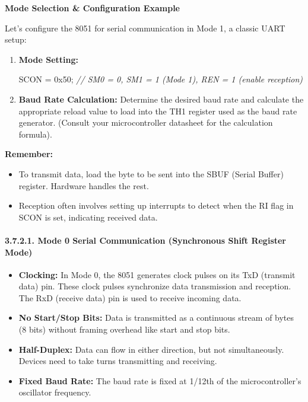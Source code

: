 \documentclass[
]{article}
\newenvironment{Shaded}{}{}
\newcommand{\BaseNTok}[1]{\textcolor[rgb]{0.25,0.63,0.44}{#1}}
\newcommand{\CommentTok}[1]{\textcolor[rgb]{0.38,0.63,0.69}{\textit{#1}}}
\newcommand{\NormalTok}[1]{#1}
\newcommand{\OperatorTok}[1]{\textcolor[rgb]{0.40,0.40,0.40}{#1}}
\begin{document}
\textbf{Mode Selection \& Configuration Example}

Let's configure the 8051 for serial communication in Mode 1, a classic
UART setup:

\begin{enumerate}
\def\labelenumi{\arabic{enumi}.}
\item
  \textbf{Mode Setting:}

\begin{Shaded}
\begin{Highlighting}[]
\NormalTok{SCON }\OperatorTok{=} \BaseNTok{0x50}\OperatorTok{;} \CommentTok{// SM0 = 0, SM1 = 1 (Mode 1), REN = 1 (enable reception)}
\end{Highlighting}
\end{Shaded}
\item
  \textbf{Baud Rate Calculation:} Determine the desired baud rate and
  calculate the appropriate reload value to load into the TH1 register
  used as the baud rate generator. (Consult your microcontroller
  datasheet for the calculation formula).
\end{enumerate}

\textbf{Remember:}

\begin{itemize}
\item
  To transmit data, load the byte to be sent into the SBUF (Serial
  Buffer) register. Hardware handles the rest.
\item
  Reception often involves setting up interrupts to detect when the RI
  flag in SCON is set, indicating received data.
\end{itemize}

\hypertarget{3721-mode-0-serial-communication-synchronous-shift-register-mode}{%
\paragraph{3.7.2.1. Mode 0 Serial Communication (Synchronous Shift
Register
Mode)}\label{3721-mode-0-serial-communication-synchronous-shift-register-mode}}

\begin{itemize}
\item
  \textbf{Clocking:} In Mode 0, the 8051 generates clock pulses on its
  TxD (transmit data) pin. These clock pulses synchronize data
  transmission and reception. The RxD (receive data) pin is used to
  receive incoming data.
\item
  \textbf{No Start/Stop Bits:} Data is transmitted as a continuous
  stream of bytes (8 bits) without framing overhead like start and stop
  bits.
\item
  \textbf{Half-Duplex:} Data can flow in either direction, but not
  simultaneously. Devices need to take turns transmitting and receiving.
\item
  \textbf{Fixed Baud Rate:} The baud rate is fixed at 1/12th of the
  microcontroller's oscillator frequency.
\end{itemize}
\end{document}
